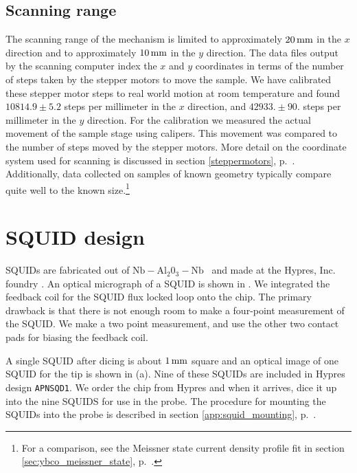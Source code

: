 \subsection{Scanning range}

\label{sec:scanning_mechanical}
The scanning range of the mechanism is limited to approximately
$20\,\mathrm{mm}$ in the $x$ direction and to approximately
$10\,\mathrm{mm}$ in the $y$ direction.
The data files output by the scanning computer index the 
$x$ and $y$ coordinates in terms of the number of steps taken
by the stepper motors to move the sample. We have calibrated these
stepper motor steps to real world motion 
at room temperature and found
$10814.9\pm 5.2$ steps per millimeter in the $x$ direction,
and $42933.\pm 90.$ steps per millimeter in the $y$ direction.
For the calibration we measured the actual movement of the 
sample stage using calipers. This movement was compared to the
number of steps moved by the stepper motors.  
More detail on the coordinate system used for scanning is 
discussed in section \ref{steppermotors}, p.~\pageref{steppermotors}. 
Additionally, data collected on samples of known geometry typically
compare quite well to the known size.\footnote{For a comparison, see
the Meissner state current density profile fit in section
\ref{sec:ybco_meissner_state}, p.~\pageref{sec:ybco_meissner_state}.}

\section{SQUID design}

SQUIDs are fabricated out of $\mathrm{Nb}-\mathrm{Al}_2\mathrm{0}_3-
\mathrm{Nb}$ \jjsnoun\ and made at the Hypres, Inc. foundry%
\cite{hypres}. An optical micrograph of a
SQUID is shown in . 
We integrated the feedback coil for the SQUID flux locked loop
onto the chip. The primary drawback is that there is
not enough room to make a four-point measurement of the SQUID.
We make a two point measurement, and use the other two contact pads for 
biasing the feedback coil. 

A single SQUID after dicing is about $1\,\mathrm{mm}$ square and an
optical image of one SQUID for the tip is shown in 
(a). 
Nine of these SQUIDs are included in Hypres design 
\texttt{APNSQD1}.%
We order the chip from Hypres and when it arrives, 
dice it up into the nine SQUIDS for use in the probe. 
The procedure for mounting the SQUIDs into the 
probe is described in 
section \ref{app:squid_mounting}, p.~\pageref{app:squid_mounting}.

